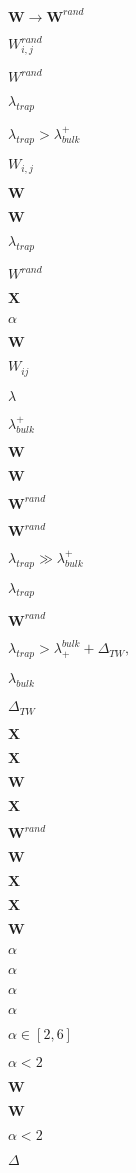 $\mathbf{W}\rightarrow\mathbf{W}^{rand}$

$W^{rand}_{i,j}$

$W^{rand}$

$\lambda_{trap}$

$\lambda_{trap}>\lambda^{+}_{bulk}$

$W_{i,j}$

$\mathbf{W}$

$\mathbf{W}$

$\lambda_{trap}$

$W^{rand}$

$\mathbf{X}$

$\alpha$

$\mathbf{W}$

$W_{ij}$

$\lambda$

$\lambda^{+}_{bulk}$

$\mathbf{W}$

$\mathbf{W}$

$\mathbf{W}^{rand}$

$\mathbf{W}^{rand}$

$\lambda_{trap}\gg\lambda^{+}_{bulk}$

$\lambda_{trap}$

$\mathbf{W}^{rand}$

$ \lambda_{trap}>\lambda^{bulk}_{+}+\Delta_{TW} , $

$\lambda_{bulk}$

$\Delta_{TW}$

$\mathbf{X}$

$\mathbf{X}$

$\mathbf{W}$

$\mathbf{X}$

$\mathbf{W}^{rand}$

$\mathbf{W}$

$\mathbf{X}$

$\mathbf{X}$


$\mathbf{W}$

$\alpha$

$\alpha$

$\alpha$

$\alpha$

$\alpha\in [2,6]$

$\alpha <2$

$\mathbf{W}$

$\mathbf{W}$

$\alpha<2$

$\Delta $

